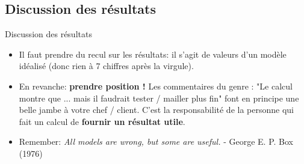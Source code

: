 \subsection{Discussion des résultats}
\label{sec:Discussion des résultats}

\begin{frame}[c]{Discussion des résultats}
    \begin{itemize}
        \item Il faut prendre du recul sur les résultats: il s’agit de valeurs d’un modèle idéalisé (donc rien à 7 chiffres après la virgule).
        \item En revanche: \textbf{prendre position !} Les commentaires du genre : "Le calcul montre que ... mais il faudrait tester / mailler plus fin" font en principe une belle jambe à votre chef / client. C’est la responsabilité de la personne qui fait un calcul de \textbf{fournir un résultat utile}.
        \item Remember: \textit{All models are wrong, but some are useful.} - George E. P. Box (1976)
    \end{itemize}
\end{frame}
